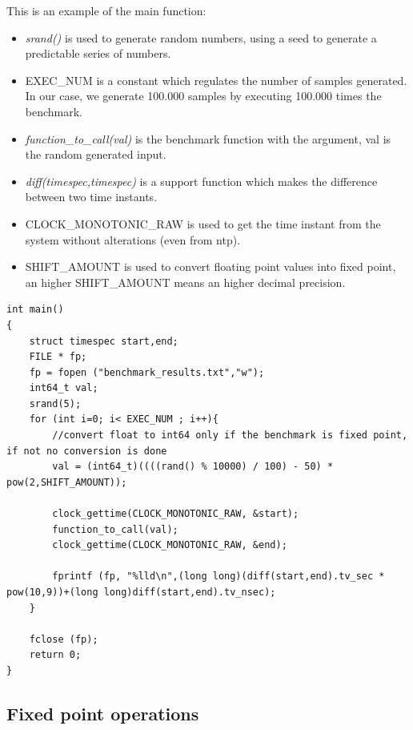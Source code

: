 This is an example of the main function:
\begin{itemize}
	\item \textit{srand()} is used to generate random numbers, using a seed to generate a predictable series of numbers.
	\item EXEC\_NUM is a constant which regulates the number of samples generated. In our case, we generate 100.000 samples by executing 100.000 times the benchmark.
	\item \textit{function\_to\_call(val)} is the benchmark function with the argument, val is the random generated input.
	\item \textit{diff(timespec,timespec)} is a support function which makes the difference between two time instants.
	\item CLOCK\_MONOTONIC\_RAW is used to get the time instant from the system without alterations (even from ntp).
	\item SHIFT\_AMOUNT is used to convert floating point values into fixed point, an higher SHIFT\_AMOUNT means an higher decimal precision.
\end{itemize}
\begin{lstlisting}
int main()
{
	struct timespec start,end;
	FILE * fp;
	fp = fopen ("benchmark_results.txt","w");
	int64_t val;
	srand(5);
	for (int i=0; i< EXEC_NUM ; i++){
		//convert float to int64 only if the benchmark is fixed point, if not no conversion is done
		val = (int64_t)((((rand() % 10000) / 100) - 50) * pow(2,SHIFT_AMOUNT));
		
		clock_gettime(CLOCK_MONOTONIC_RAW, &start);
		function_to_call(val);
		clock_gettime(CLOCK_MONOTONIC_RAW, &end);
		
		fprintf (fp, "%lld\n",(long long)(diff(start,end).tv_sec * pow(10,9))+(long long)diff(start,end).tv_nsec);
	}
	
	fclose (fp);
	return 0;
}
\end{lstlisting}

\subsection{Fixed point operations}

